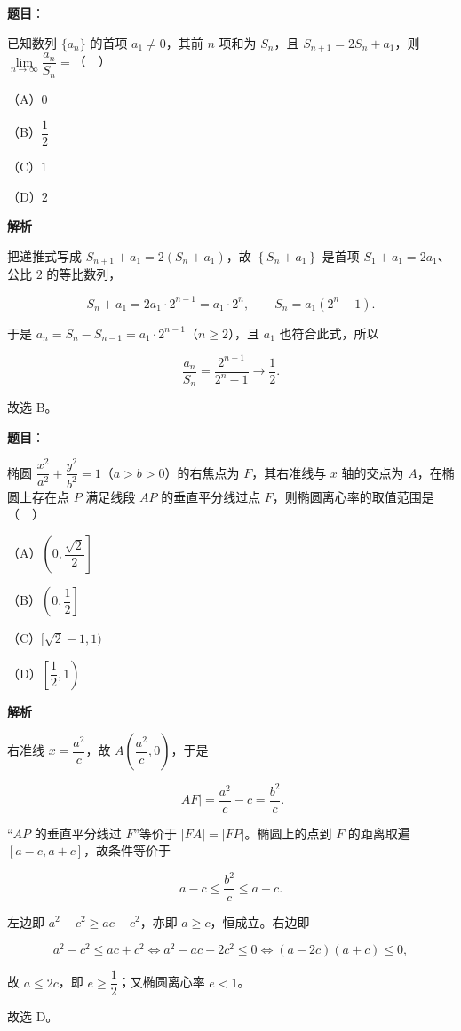 \begin{answer}

\textbf{题目}：

已知数列 $\{a_n\}$ 的首项 $a_1\neq0$，其前 $n$ 项和为 $S_n$，且 $S_{n+1}=2S_n+a_1$，则 $\lim\limits_{n\to\infty}\dfrac{a_n}{S_n}=$（　）

（A）$0$

（B）$\dfrac{1}{2}$

（C）$1$

（D）$2$

\textbf{解析}

把递推式写成 $S_{n+1}+a_1=2\left(S_n+a_1\right)$，故 $\left\{S_n+a_1\right\}$ 是首项 $S_1+a_1=2a_1$、公比 $2$ 的等比数列，

\nopagebreak[4]
\[S_n+a_1=2a_1\cdot2^{n-1}=a_1\cdot2^n,\qquad S_n=a_1\left(2^n-1\right).\]

于是 $a_n=S_n-S_{n-1}=a_1\cdot2^{n-1}$（$n\geqslant2$），且 $a_1$ 也符合此式，所以

\nopagebreak[4]
\[\frac{a_n}{S_n}=\frac{2^{n-1}}{2^n-1}\longrightarrow\frac12.\]

故选 B。


\end{answer}
\begin{answer}

\textbf{题目}：

椭圆 $\dfrac{x^2}{a^2}+\dfrac{y^2}{b^2}=1$（$a>b>0$）的右焦点为 $F$，其右准线与 $x$ 轴的交点为 $A$，在椭圆上存在点 $P$ 满足线段 $AP$ 的垂直平分线过点 $F$，则椭圆离心率的取值范围是（　）

（A）$\left(0,\dfrac{\sqrt2}{2}\right]$

（B）$\left(0,\dfrac{1}{2}\right]$

（C）$[\sqrt2-1,1)$

（D）$\left[\dfrac{1}{2},1\right)$

\textbf{解析}

右准线 $x=\dfrac{a^2}c$，故 $A\left(\dfrac{a^2}c,0\right)$，于是

\nopagebreak[4]
\[|AF|=\frac{a^2}c-c=\frac{b^2}c.\]

“$AP$ 的垂直平分线过 $F$”等价于 $|FA|=|FP|$。椭圆上的点到 $F$ 的距离取遍 $[a-c,a+c]$，故条件等价于

\nopagebreak[4]
\[a-c\leqslant\frac{b^2}c\leqslant a+c.\]

左边即 $a^2-c^2\geqslant ac-c^2$，亦即 $a\geqslant c$，恒成立。右边即

\nopagebreak[4]
\[a^2-c^2\leqslant ac+c^2\iff a^2-ac-2c^2\leqslant0\iff(a-2c)(a+c)\leqslant0,\]

故 $a\leqslant2c$，即 $e\geqslant\dfrac12$；又椭圆离心率 $e<1$。

故选 D。


\end{answer}
